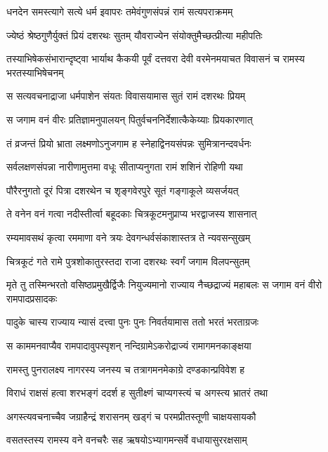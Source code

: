 \twolineshloka
{धनदेन समस्त्यागे सत्ये धर्म इवापरः}
{तमेवंगुणसंपन्नं रामं सत्यपराक्रमम्} %

\twolineshloka
{ज्येष्ठं श्रेष्ठगुणैर्युक्तं प्रियं दशरथः सुतम्}
{यौवराज्येन संयोक्तुमैच्छत्प्रीत्या महीपतिः} %

\threelineshloka
{तस्याभिषेकसंभारान्दृष्ट्वा भार्याथ कैकयी}
{पूर्वं दत्तवरा देवी वरमेनमयाचत}
{विवासनं च रामस्य भरतस्याभिषेचनम्} %

\twolineshloka
{स सत्यवचनाद्राजा धर्मपाशेन संयतः}
{विवासयामास सुतं रामं दशरथः प्रियम्} %

\twolineshloka
{स जगाम वनं वीरः प्रतिज्ञामनुपालयन्}
{पितुर्वचननिर्देशात्कैकेय्याः प्रियकारणात्} %

\twolineshloka
{तं व्रजन्तं प्रियो भ्राता लक्ष्मणोऽनुजगाम ह}
{स्नेहाद्विनयसंपन्नः सुमित्रानन्दवर्धनः} %

\twolineshloka
{सर्वलक्षणसंपन्ना नारीणामुत्तमा वधूः}
{सीताप्यनुगता रामं शशिनं रोहिणी यथा} %

\twolineshloka
{पौरैरनुगतो दूरं पित्रा दशरथेन च}
{शृङ्गवेरपुरे सूतं गङ्गाकूले व्यसर्जयत्} %

\twolineshloka
{ते वनेन वनं गत्वा नदीस्तीर्त्वा बहूदकाः}
{चित्रकूटमनुप्राप्य भरद्वाजस्य शासनात्} %

\twolineshloka
{रम्यमावसथं कृत्वा रममाणा वने त्रयः}
{देवगन्धर्वसंकाशास्तत्र ते न्यवसन्सुखम्} %

\twolineshloka
{चित्रकूटं गते रामे पुत्रशोकातुरस्तदा}
{राजा दशरथः स्वर्गं जगाम विलपन्सुतम्} %

\threelineshloka
{मृते तु तस्मिन्भरतो वसिष्ठप्रमुखैर्द्विजैः}
{नियुज्यमानो राज्याय नैच्छद्राज्यं महाबलः}
{स जगाम वनं वीरो रामपादप्रसादकः} %

\twolineshloka
{पादुके चास्य राज्याय न्यासं दत्त्वा पुनः पुनः}
{निवर्तयामास ततो भरतं भरताग्रजः} %

\twolineshloka
{स काममनवाप्यैव रामपादावुपस्पृशन्}
{नन्दिग्रामेऽकरोद्राज्यं रामागमनकाङ्क्षया} %

\twolineshloka
{रामस्तु पुनरालक्ष्य नागरस्य जनस्य च}
{तत्रागमनमेकाग्रे दण्डकान्प्रविवेश ह} %

\twolineshloka
{विराधं राक्षसं हत्वा शरभङ्गं ददर्श ह}
{सुतीक्ष्णं चाप्यगस्त्यं च अगस्त्य भ्रातरं तथा} %

\twolineshloka
{अगस्त्यवचनाच्चैव जग्राहैन्द्रं शरासनम्}
{खड्गं च परमप्रीतस्तूणी चाक्षयसायकौ} %

\twolineshloka
{वसतस्तस्य रामस्य वने वनचरैः सह}
{ऋषयोऽभ्यागमन्सर्वे वधायासुररक्षसाम्} %

